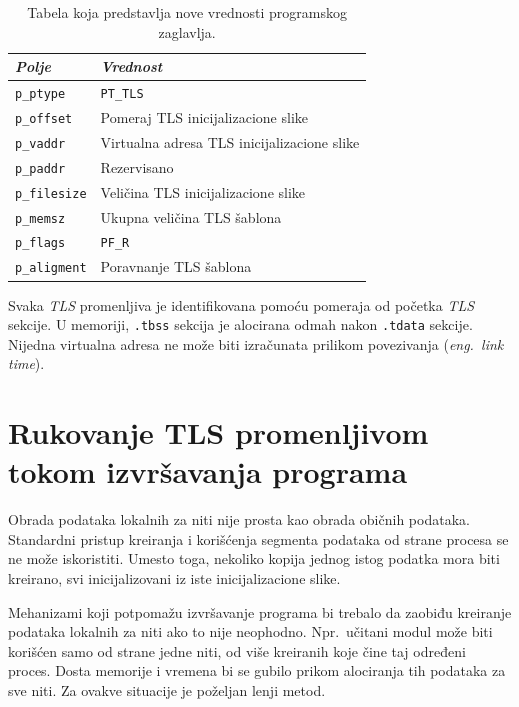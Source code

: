 \documentclass[12pt,oneside]{memoir}
\begin{document}
\begin{table}
		\begin{center}
		\begin{tabular}{ | l | l |}
			\hline
			\emph{Polje} & \emph{Vrednost} \\ \hline
			\texttt{p\_ptype} & \texttt{PT\_TLS} \\ \hline
			\texttt{p\_offset} & Pomeraj TLS inicijalizacione slike  \\ \hline
			\texttt{p\_vaddr} & Virtualna adresa TLS inicijalizacione slike  \\ \hline
			\texttt{p\_paddr} & Rezervisano  \\ \hline
			\texttt{p\_filesize} & Veličina TLS inicijalizacione slike  \\ \hline
			\texttt{p\_memsz} & Ukupna veličina TLS šablona  \\ \hline
			\texttt{p\_flags} & \texttt{PF\_R}  \\ \hline
			\texttt{p\_aligment} & Poravnanje TLS šablona  \\ \hline
		\end{tabular}
	   \end{center}
		\caption{\label{tab:tls_prheader}Tabela koja predstavlja nove vrednosti programskog zaglavlja.}
\end{table}

Svaka \emph{TLS} promenljiva je identifikovana pomoću pomeraja od početka \emph{TLS} sekcije. U memoriji, \texttt{.tbss} sekcija je alocirana odmah nakon \texttt{.tdata} sekcije. Nijedna virtualna adresa ne može biti izračunata prilikom povezivanja (\emph{eng.~link time}).

\section{Rukovanje TLS promenljivom tokom izvršavanja programa}

Obrada podataka lokalnih za niti nije prosta kao obrada običnih podataka. Standardni pristup kreiranja i korišćenja segmenta podataka od strane procesa se ne može iskoristiti. Umesto toga, nekoliko kopija jednog istog podatka mora biti kreirano, svi inicijalizovani iz iste inicijalizacione slike.

Mehanizami koji potpomažu izvršavanje programa bi trebalo da zaobiđu kreiranje podataka lokalnih za niti ako to nije neophodno. Npr.~učitani modul može biti korišćen samo od strane jedne niti, od više kreiranih koje čine taj određeni proces. Dosta memorije i vremena bi se gubilo prikom alociranja tih podataka za sve niti. Za ovakve situacije je poželjan lenji metod.
\end{document}
